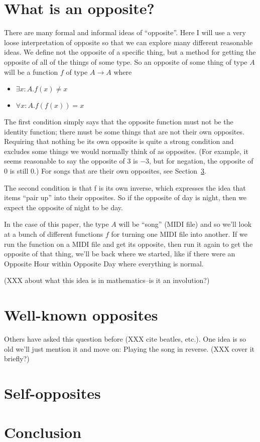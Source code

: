 \documentclass[twocolumn]{article}
\begin{document}
\section{What is an opposite?}

There are many formal and informal ideas of ``opposite''. Here I will
use a very loose interpretation of opposite so that we can explore
many different reasonable ideas. We define not the opposite of a
specific thing, but a method for getting the opposite of all of the
things of some type. So an opposite of some thing of type $A$ will be a
function $f$ of type $A \rightarrow A$ where
%
\begin{itemize}
\item $\exists x{:}A. f(x) \neq x$
\item $\forall x{:}A. f(f(x)) = x$
\end{itemize}

The first condition simply says that the opposite function must not be
the identity function; there must be some things that are not their
own opposites. Requiring that nothing be its own opposite is quite a
strong condition and excludes some things we would normally think of
as opposites. (For example, it seems reasonable to say the opposite of
$3$ is $-3$, but for negation, the opposite of $0$ is still $0$.) For
songs that are their own opposites, see
Section~\ref{sec:selfopposites}.

The second condition is that f is its own inverse, which expresses
the idea that items ``pair up'' into their opposites. So if the opposite
of day is night, then we expect the opposite of night to be day.

In the case of this paper, the type $A$ will be ``song'' (MIDI file)
and so we'll look at a bunch of different functions $f$ for turning
one MIDI file into another. If we run the function on a MIDI file and
get its opposite, then run it again to get the opposite of that thing,
we'll be back where we started, like if there were an Opposite Hour
within Opposite Day where everything is normal.

(XXX about what this idea is in mathematics--is it an involution?)

\section{Well-known opposites}

Others have asked this question before (XXX cite beatles, etc.). One
idea is so old we'll just mention it and move on: Playing the song
in reverse. (XXX cover it briefly?)


\section{Self-opposites} \label{sec:selfopposites}

\section{Conclusion}


{}

\end{document}
